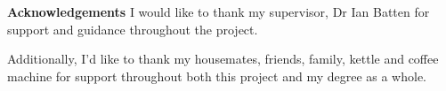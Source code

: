 {\huge\textbf{Acknowledgements}}
\vspace{0.7cm}
\newline
I would like to thank my supervisor, Dr Ian Batten for support and guidance throughout the project.
\par
Additionally, I'd like to thank my housemates, friends, family, kettle and coffee machine for support throughout both this project and my degree as a whole.

